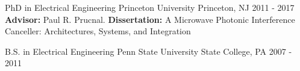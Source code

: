 

\begin{cventries}

  \cventry
    {PhD in Electrical Engineering} %
    {Princeton University} %
    {Princeton, NJ} %
    {2011 - 2017} %
    {
    \textbf{Advisor:} Paul R. Prucnal. \textbf{Dissertation:} A Microwave Photonic Interference Canceller: Architectures, Systems, and Integration
    }

  \cventry
    {B.S. in Electrical Engineering}
    {Penn State University}
    {State College, PA}
    {2007 - 2011}
    {}

\end{cventries}
